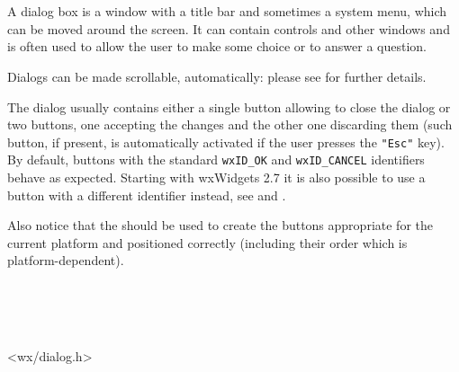 
\section{}\label{wxdialog}

A dialog box is a window with a title bar and sometimes a system menu, which
can be moved around the screen. It can contain controls and other windows and
is often used to allow the user to make some choice or to answer a question.

Dialogs can be made scrollable, automatically: please see  for further details.


The dialog usually contains either a single button allowing to close the
dialog or two buttons, one accepting the changes and the other one discarding
them (such button, if present, is automatically activated if the user presses
the \texttt{"Esc"} key). By default, buttons with the standard \texttt{wxID\_OK} 
and \texttt{wxID\_CANCEL} identifiers behave as expected. Starting with
wxWidgets 2.7 it is also possible to use a button with a different identifier
instead, see  and 
.

Also notice that the  
should be used to create the buttons appropriate for the current platform and
positioned correctly (including their order which is platform-dependent).


\\
\\
\\


<wx/dialog.h>


